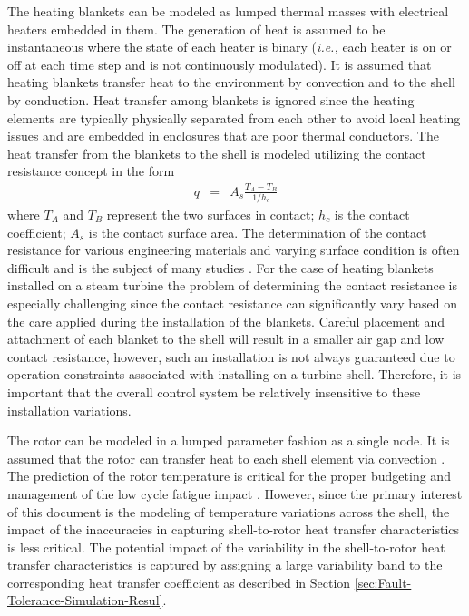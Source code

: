 \documentclass[a4paper, 10pt, conference]{ieeeconf}      %
\begin{document}
The heating blankets can be modeled as lumped thermal masses with
electrical heaters embedded in them. The generation of heat is assumed to be instantaneous
where the state of each heater is binary (\emph{i.e.,} each heater
is on or off at each time step and is not continuously modulated).
It is assumed that heating blankets transfer heat to the environment
by convection and to the shell by conduction. Heat transfer among
blankets is ignored since the heating elements are typically physically
separated from each other to avoid local heating issues and are embedded
in enclosures that are poor thermal conductors. The heat transfer
from the blankets to the shell is modeled utilizing the contact resistance
concept \cite{Holman1992} in the form
\begin{eqnarray*}
q & = & A_{s}\frac{T_{A}-T_{B}}{1/h_{c}}
\end{eqnarray*}
where $T_{A}$ and $T_{B}$ represent the two surfaces in contact;
$h_{c}$ is the contact coefficient; $A_{s}$ is the contact surface area.
The determination of the contact resistance for various engineering
materials and varying surface condition is often difficult and is
the subject of many studies \cite{Madhusudana1986}. For the case
of heating blankets installed on a steam turbine the problem of determining
the contact resistance is especially challenging since the contact resistance
can significantly vary based on the care applied during the installation
of the blankets. Careful placement and attachment of each blanket to
the shell will result in a smaller air gap and low contact resistance,
however, such an installation is not always guaranteed due to operation
constraints associated with installing on a turbine shell. Therefore, it is important that the overall control system be relatively insensitive to these installation
variations. 

The rotor can be modeled in a lumped parameter fashion as a single node.
It is assumed that the rotor can transfer heat to each shell element
via convection \cite{Marinescu2015a}. The prediction of the rotor
temperature is critical for the proper budgeting and management of
the low cycle fatigue impact \cite{Marinescu2012}. However, since
the primary interest of this document is the modeling of temperature
variations across the shell, the impact of the inaccuracies in capturing
shell-to-rotor heat transfer characteristics is less critical. 
The potential impact of the variability in the shell-to-rotor heat
transfer characteristics is captured by assigning a large variability
band to the corresponding heat transfer coefficient as described in
Section \ref{sec:Fault-Tolerance-Simulation-Resul}.
\end{document}
